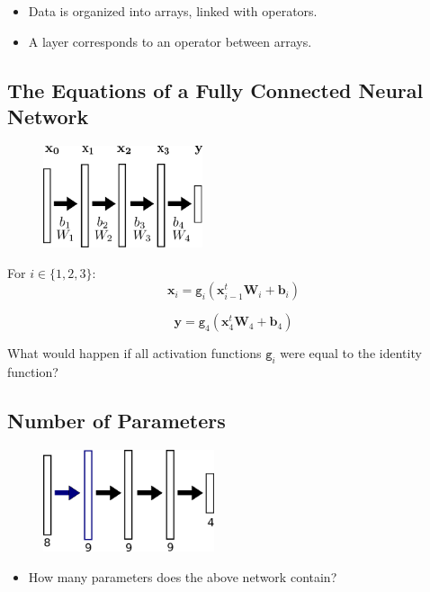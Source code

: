 \documentclass{book}
\newcommand{\x}{\mathbf{x}}
\newcommand{\y}{\mathbf{y}}
\newcommand{\W}{\mathbf{W}} %
\newcommand{\bias}{\mathbf{b}}%
\newcommand{\act}{\texttt{g}}%
\begin{document}
\begin{itemize}
\item Data is organized into arrays, linked with operators.
\item A layer corresponds to an operator between arrays.
\end{itemize}

\subsection{The Equations of a Fully Connected Neural Network}

\begin{figure}[h]
    \centering
    \includegraphics[height=3cm]{nn_representation2}
\end{figure}

\begin{myblock}{}
For $i \in \{1, 2, 3\}$:
\[
\x_i = \act_i(\x_{i-1}^t \W_i + \bias_i)
\]
\end{myblock}

\begin{myblock}{}
\[
\y = \act_4(\x_4^t \W_4 + \bias_4)
\]
\end{myblock}

What would happen if all activation functions $\act_i$ were equal to the identity function?

\subsection{Number of Parameters}

\begin{figure}[h]
    \centering
    \includegraphics[height=3cm]{nn_representation.png}
\end{figure}

\begin{itemize}
\item How many parameters does the above network contain?
\end{itemize}
\end{document}
